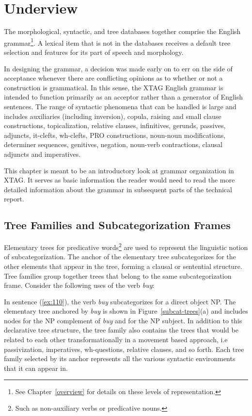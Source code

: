 \chapter{Underview} 
\label{underview} 
 
The morphological, syntactic, and tree databases together comprise the 
English grammar\footnote{ See Chapter~\ref{overview} for details on these levels of representation. }.  A lexical item that is not in the 
databases receives a default tree selection and features for its part 
of speech and morphology.  
 
In designing the grammar, a decision was made early on to err on the 
side of acceptance whenever there are conflicting opinions as to 
whether or not a construction is grammatical.  In this sense, the XTAG 
English grammar is intended to function primarily as an acceptor 
rather than a generator of English sentences.  The range of syntactic 
phenomena that can be handled is large and includes auxiliaries 
(including inversion), copula, raising and small clause constructions, 
topicalization, relative clauses, infinitives, gerunds, passives, 
adjuncts, it-clefts, wh-clefts, PRO constructions, noun-noun 
modifications, determiner sequences, genitives, negation, noun-verb 
contractions, clausal adjuncts and imperatives. 
 
This chapter is meant to be an introductory look at grammar 
organization in XTAG. It serves as basic information the reader would 
need to read the more detailed information about the grammar in 
subsequent parts of the technical report. 
 
\section{Tree Families and Subcategorization Frames} 
\label{subcat-frames} 
 
Elementary trees for predicative words\footnote{ Such as non-auxiliary verbs or predicative nouns. } are used to represent the linguistic 
notion of subcategorization.  The anchor of the elementary tree 
subcategorizes for the other elements that appear in the tree, forming 
a clausal or sentential structure.  Tree families group together trees 
that belong to the same subcategorization frame. Consider the 
following uses of the verb {\it buy}: 
 
\beginsentences
{}\label{ex:110} 
\label{ex:111} 
\endsentences

 
In sentence (\ref{ex:110}), the verb {\it buy} subcategorizes for a direct 
object NP.  The elementary tree anchored by {\it buy} is shown in 
Figure~\ref{subcat-trees}(a) and includes nodes for the NP complement 
of {\it buy} and for the NP subject.  In addition to this declarative 
tree structure, the tree family also contains the trees that would be 
related to each other transformationally in a movement based approach, 
i.e passivization, imperatives, wh-questions, relative clauses, and so 
forth.  Each tree family selected by its anchor represents all the 
various syntactic environments that it can appear in. 
 
